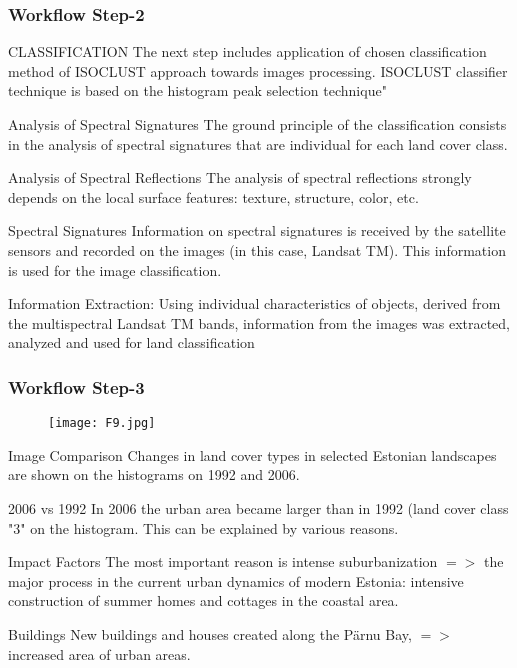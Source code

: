\documentclass[pdflatex,compress,9pt,
	xcolor={dvipsnames,dvipsnames,svgnames,x11names,table},
	hyperref={colorlinks = true,breaklinks = true, urlcolor = NavyBlue, breaklinks = true}]{beamer}
\begin{document}
\begin{frame}\frametitle{Workflow Step-2}

\begin{block}{CLASSIFICATION}
The next step includes application of chosen classification method of ISOCLUST approach towards images processing. ISOCLUST classifier technique is based on the histogram peak selection technique"
\end{block}

\begin{block}{Analysis of Spectral Signatures}
The ground principle of the classification consists in the analysis of spectral signatures that are individual for each land cover class.
\end{block}

\begin{block}{Analysis of Spectral Reflections}
The analysis of spectral reflections strongly depends on the local surface features: texture, structure, color, etc.
\end{block}

\begin{block}{Spectral Signatures}
Information on spectral signatures is received by the satellite sensors and recorded on the images (in this case, Landsat TM). This information is used for the image classification.
\end{block}

\begin{examples}{Information Extraction:}
Using individual characteristics of objects, derived from the multispectral Landsat TM bands, information from the images was extracted, analyzed and used for land classification
\end{examples}

\end{frame}

\begin{frame}\frametitle{Workflow Step-3}
\begin{figure}[H]
	\centering
		\texttt{[image: F9.jpg]}
\end{figure}
\begin{block}{Image Comparison}
Changes in land cover types in selected Estonian landscapes are shown on the histograms on 1992 and 2006.
\end{block}

\begin{block}{2006 vs 1992}
 In 2006 the urban area became larger than in 1992 (land cover class "3" on the histogram. This can be explained by various reasons.
\end{block}

\begin{block}{Impact Factors}
The most important reason is intense suburbanization $=>$ the major process in the current urban dynamics of modern Estonia: intensive construction of summer homes and cottages in the coastal area.
\end{block}

\begin{block}{Buildings}
New buildings and houses created along the P\"{a}rnu Bay, $=>$ increased area of urban areas.
\end{block}
\end{frame}
\end{document}
